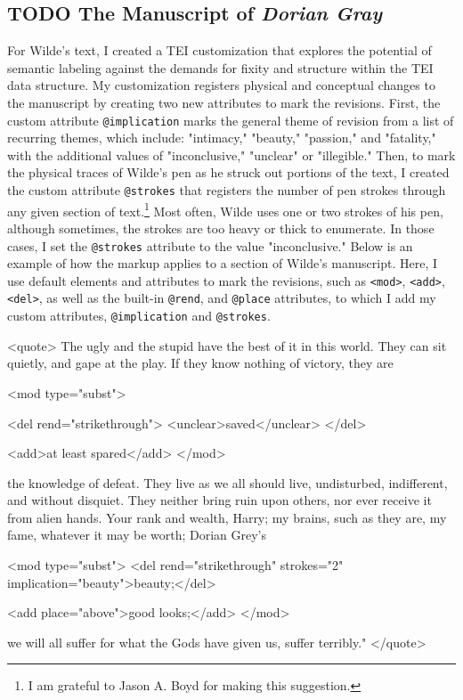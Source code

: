 \documentclass[11pt]{article}
\begin{document}
\subsection{{\bfseries\sffamily TODO} The Manuscript of \emph{Dorian Gray}}
\label{sec:org9f07039}
For Wilde's text, I created a TEI customization that explores the
potential of semantic labeling against the demands for fixity and
structure within the TEI data structure. My customization registers
physical and conceptual changes to the manuscript by creating two new
attributes to mark the revisions. First, the custom attribute
\texttt{@implication} marks the general theme of revision from a list of
recurring themes, which include: "intimacy," "beauty," "passion," and
"fatality," with the additional values of "inconclusive," "unclear" or
"illegible." Then, to mark the physical traces of Wilde's pen as he
struck out portions of the text, I created the custom attribute
\texttt{@strokes} that registers the number of pen strokes through any given
section of text.\footnote{I am grateful to Jason A. Boyd for making this suggestion.} Most often, Wilde uses one or two strokes of
his pen, although sometimes, the strokes are too heavy or thick to
enumerate. In those cases, I set the \texttt{@strokes} attribute to the value
"inconclusive." Below is an example of how the markup applies to a
section of Wilde's manuscript. Here, I use default elements and
attributes to mark the revisions, such as \texttt{<mod>}, \texttt{<add>}, \texttt{<del>},
as well as the built-in \texttt{@rend}, and \texttt{@place} attributes, to which I
add my custom attributes, \texttt{@implication} and \texttt{@strokes}.

\begin{SOURCE}
<quote> The ugly and the stupid have the best of it in this
world. They can sit quietly, and gape at the play. If they know
nothing of victory, they are 

<mod type="subst"> 

<del rend="strikethrough"> <unclear>saved</unclear> </del> 

<add>at least spared</add> </mod> 

the knowledge of defeat. They live as we all should live, undisturbed,
indifferent, and without disquiet. They neither bring ruin upon
others, nor ever receive it from alien hands. Your rank and wealth,
Harry; my brains, such as they are, my fame, whatever it may be worth;
Dorian Grey's 

<mod type="subst"> <del rend="strikethrough" strokes="2"
implication="beauty">beauty;</del> 

<add place="above">good looks;</add> </mod> 

we will all suffer for what the Gods have given us, suffer terribly."
</quote>
\end{SOURCE}
\end{document}
